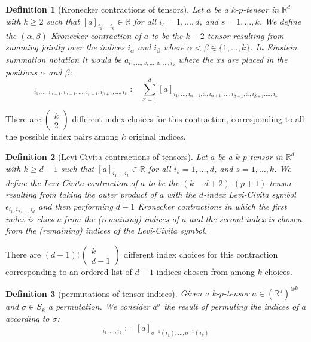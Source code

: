 \documentclass{article}
\theoremstyle{plain}
\newtheorem{definition}{Definition}
\renewcommand{\choose}[2]{\begin{pmatrix}{#1}\\{#2}\end{pmatrix}}
\begin{document}
\begin{definition}[Kronecker contractions of tensors]
Let $a$ be a $k$-$p$-tensor in $\mathbb R^d$ with $k\geq 2$ such that $[a]_{i_1,\ldots i_k}\in \mathbb R$ for all $i_s = 1,\ldots, d$, and $s=1,\ldots, k$. We define the $(\alpha,\beta)$ Kronecker contraction of $a$ to be the $k-2$ tensor resulting from summing jointly over the indices $i_\alpha$ and $i_\beta$ where $\alpha < \beta \in\{1,\ldots, k\}$. In Einstein summation notation it would be $a_{i_1, \ldots, x, \ldots , x, \ldots, i_k}$ where the $x$s are placed in the positions $\alpha$ and $\beta$:
\begin{equation}
[a^{(\alpha,\beta)}]_{i_1,\ldots, i_{\alpha-1}, i_{\alpha+1}, \ldots, i_{\beta-1}, i_{\beta+1} , \ldots, i_k} := \sum_{x=1}^d [a]_{i_1, \ldots, i_{\alpha-1}, x, i_{\alpha+1}, \ldots, i_{\beta-1}, x, i_{\beta+1}. \ldots, i_k}
\end{equation}
\end{definition}
There are $\choose{k}{2}$ different index choices for this contraction, corresponding to all the possible index pairs among $k$ original indices.

\begin{definition}[Levi-Civita contractions of tensors]
Let $a$ be a $k$-$p$-tensor in $\mathbb R^d$ with $k\geq d-1$ such that $[a]_{i_1,\ldots i_k}\in \mathbb R$ for all $i_s = 1,\ldots, d$, and $s=1,\ldots, k$. We define the Levi-Civita contraction of $a$ to be the $(k-d+2)$-$(p+1)$-tensor resulting from taking the outer product of 
$a$ with the $d$-index Levi-Civita symbol $\epsilon_{i_1,i_2,\ldots,i_d}$ and then performing $d-1$ Kronecker contractions in which the first index is chosen from the (remaining) indices of $a$ and the second index is chosen from the (remaining) indices of the Levi-Civita symbol.
\end{definition}
There are $(d-1)!\,\choose{k}{d-1}$ different index choices for this contraction corresponding to an ordered list of $d-1$ indices chosen from among $k$ choices.

\begin{definition}[permutations of tensor indices]
Given a $k$-$p$-tensor $a\in (\mathbb R^d)^{\otimes k}$ and $\sigma\in S_k$ a permutation. We consider $a^\sigma$ the result of permuting the indices of $a$ according to $\sigma$:
\begin{equation}
    [a^\sigma]_{i_1, \ldots, i_k} := [a]_{\sigma^{-1}(i_1), \ldots, \sigma^{-1}(i_k)}
\end{equation}
\end{definition}
\end{document}
